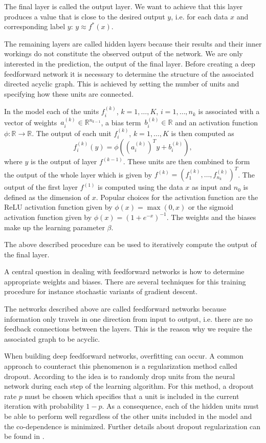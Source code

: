 \documentclass[12pt, a4paper]{scrartcl}
\theoremstyle{definition}
\theoremstyle{plain}
\numberwithin{equation}{section}
\numberwithin{figure}{section}
\numberwithin{table}{section}
\begin{document}
	The final layer is called the output layer.
	We want to achieve that this layer produces a value that is close to the desired output $y$, i.e. for each data $x$ and corresponding label $y$: $y \approx f^*(x)$.
	
	The remaining layers are called hidden layers because their results and their inner workings do not constitute the observed output of the network.
	We are only interested in the prediction, the output of the final layer.
	Before creating a deep feedforward network it is necessary to determine the structure of the associated directed acyclic graph.
	This is achieved by setting the number of units and specifying how these units are connected.
	
	In the model each of the units $f^{(k)}_i$, $k=1,\dots,K$, $i = 1,\dots,n_{k}$ is associated with a vector of weights~$a^{(k)}_i \in \mathbb{R}^{n_{k-1}}$, a bias term~$b^{(k)}_i\in \mathbb{R}$ and an activation function~$\phi: \mathbb{R} \to \mathbb{R}$.
	The output of each unit $f^{(k)}_i$, $k=1,\dots,K$ is then computed as
	\begin{equation*}
	f_i^{(k)}(y) = \phi \left(\left(a^{(k)}_i\right)^Ty + b^{(k)}_i\right),
	\end{equation*}
	where $y$ is the output of layer $f^{(k-1)}$.
	These units are then combined to form the output of the whole layer which is given by $f^{(k)} = \left(f^{(k)}_1,\dots, f^{(k)}_{n_k}\right)^T$.
	The output of the first layer $f^{(1)}$ is computed using the data $x$ as input and $n_0$ is defined as the dimension of $x$.
	Popular choices for the activation function are the ReLU activation function given by $\phi(x) = \max(0,x)$ or the sigmoid activation function given by $\phi(x) = (1+e^{-x})^{-1}$.
	The weights and the biases make up the learning parameter $\beta$.
	
	The above described procedure can be used to iteratively compute the output of the final layer.
	
	A central question in dealing with feedforward networks is how to determine appropriate weights and biases.
	There are several techniques for this training procedure for instance stochastic variants of gradient descent.
	
	The networks described above are called feedforward networks because information only travels in one direction from input to output, i.e. there are no feedback connections between the layers.
	This is the reason why we require the associated graph to be acyclic.
	
	When building deep feedforward networks, overfitting can occur.
	A common approach to counteract this phenomenon is a regularization method called dropout.
	According to \citet*{dropout} the idea is to randomly drop units from the neural network during each step of the learning algorithm.
	For this method, a dropout rate $p$ must be chosen which specifies that a unit is included in the current iteration with probability $1-p$.
	As a consequence, each of the hidden units must be able to perform well regardless of the other units included in the model and the co-dependence is minimized.
	Further details about dropout regularization can be found in \citet*{dropout}.
	
\end{document}
